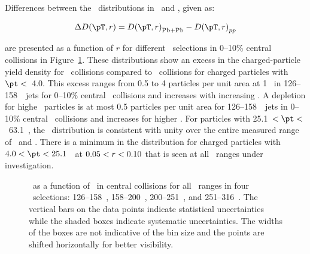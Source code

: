 Differences between the \Dptr\ distributions in \pbpb\ and \pp, given as:

\begin{align}
\DeltaDptr = \Dptr_{\mathrm{Pb+Pb}} - \Dptr_{pp}
\end{align}

are presented as a function of $r$ for different \pt\ selections in 0--10\% central collisions in Figure~\ref{fig:deltadptr}. 
These distributions show an excess  in the charged-particle yield density for \pbpb\ collisions compared to \pp\ collisions for charged particles with $\pt <$~4.0\GeV. This excess ranges from 0.5 to 4 particles per unit area at 1 \GeV\ in 126--158~\GeV\ jets for 0--10\% central \pbpb\ collisions and increases with increasing \ptjet. 
A depletion for highe \pt\ particles is at most 0.5 particles per unit area for 126--158~\GeV\ jets in  0--10\% central \pbpb\ collisions and increases for higher \ptjet. 
For particles with 25.1~$< \pt <$~63.1~\GeV, the \DeltaDptr\ distribution is consistent with unity over the entire 
measured range of \rvar\ and \ptjet.
There is a minimum in the \DeltaDptr distribution for charged particles with \mbox{$ 4.0 < \pt <  25.1$}~\GeV\ at $0.05 < \mbox{$r$} < 0.10$ that is seen at all \ptjet\ ranges under investigation.

\begin{figure}
   \caption{\DeltaDptr\ as a function of \rvar\ in central collisions for all \pt\ ranges in four \ptjet\ selections: 126--158~\GeV, 158--200~\GeV, 200--251~\GeV, and 251--316~\GeV. The vertical bars on the data points indicate statistical uncertainties while the shaded boxes indicate systematic uncertainties. The widths of the boxes are not indicative of the bin size and the points are shifted horizontally for better visibility. }
      \label{fig:deltadptr}
\end{figure}

